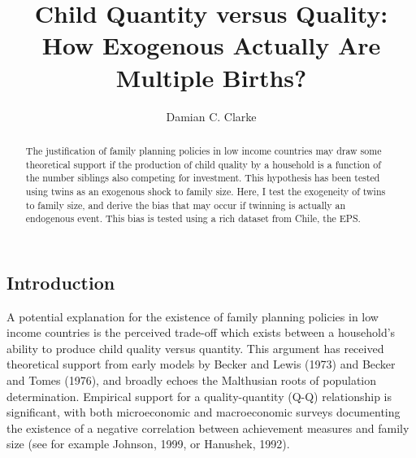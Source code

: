 \documentclass{article}[11pt,subeqn]
\title{Child Quantity versus Quality: How Exogenous Actually Are Multiple Births?}
\author{Damian C. Clarke}
\begin{document}
\begin{spacing}{1.25}

\maketitle
\begin{abstract}
The justification of family planning policies in low income countries may draw some theoretical support 
if the production of child quality by a household is a function of the number siblings also competing
for investment.  This hypothesis has been tested using twins as an exogenous shock to family size.  Here, I test
the exogeneity of twins to family size, and derive the bias that may occur if twinning is actually
an endogenous event.  This bias is tested using a rich dataset from Chile, the EPS.
\end{abstract}

\section{Introduction}
A potential explanation for the existence of family planning policies in low income countries is the
perceived trade-off which exists between a household's ability to produce child quality versus quantity.
This argument has received theoretical support from early models by Becker and Lewis
(1973) and Becker and Tomes (1976), and broadly echoes the Malthusian roots of population determination.
Empirical support for a quality-quantity (Q-Q) relationship is significant, with both microeconomic and
macroeconomic surveys documenting the existence of a negative correlation between achievement measures and
family size (see for example Johnson, 1999, or Hanushek, 1992).


\end{spacing}
\end{document}
